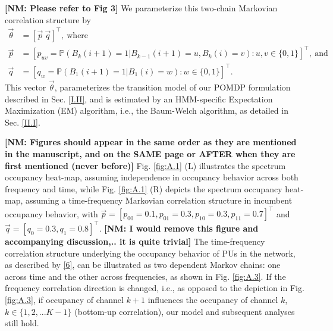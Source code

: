 \documentclass[12pt, draftcls, onecolumn]{IEEEtran}
\newcommand{\nm}[1]{{\color{blue}\bf{[NM: #1]}}}
\newcommand{\add}[1]{{\color{red}{#1}}}
\begin{document}
\nm{Please refer to Fig 3}
 We parameterize this two-chain Markovian correlation structure by
\add{the parameter vector $\vec{\theta}=[\vec{p}\ \vec{q}]^{\intercal}$, where}
\begin{equation}\label{7}
    \begin{aligned}
        \vec{\theta}&=[\vec{p}\ \vec{q}]^{\intercal},\ \text{where}\\
        \vec{p}&=[p_{uv}=\mathbb{P}(B_{k}(i+1)=1|B_{k-1}(i+1)=u,B_{k}(i)=v):u,v \in \{0,1\}]^{\intercal},\ \text{and}\\
        \vec{q}&=[q_{w}=\mathbb{P}(B_{1}(i+1)=1|B_{1}(i)=w):w \in \{0,1\}]^{\intercal}.
    \end{aligned}
\end{equation}
This vector $\vec{\theta}$, parameterizes the transition model of our POMDP formulation described in Sec. \ref{I.II}, and is estimated by an HMM-specific Expectation Maximization (EM) algorithm, i.e., the Baum-Welch algorithm, as detailed in Sec. \ref{II.I}.

\nm{Figures should appear in the same order as they are mentioned in the manuscript, and on the SAME page or AFTER when they are first mentioned (never before)}
Fig. \ref{fig:A.1} (L) illustrates the spectrum occupancy heat-map, assuming independence in occupancy behavior across both frequency and time, while Fig. \ref{fig:A.1} (R) depicts the spectrum occupancy heat-map, assuming a time-frequency Markovian correlation structure in incumbent occupancy behavior, with $\vec{p}{=}[p_{00}{=}0.1,p_{01}{=}0.3,p_{10}{=}0.3,p_{11}{=}0.7]^{\intercal}$ and $\vec{q}=[q_{0}{=}0.3,q_{1}{=}0.8]^{\intercal}$.
\nm{I would remove this figure and accompanying discussion,.. it is quite trivial}
 The time-frequency correlation structure underlying the occupancy behavior of PUs in the network, as described by \eqref{6}, can be illustrated as two dependent Markov chains: one across time and the other across frequencies, as shown in Fig. \ref{fig:A.3}. If the frequency correlation direction is changed, i.e., as opposed to the depiction in Fig. \ref{fig:A.3}, if occupancy of channel $k+1$ influences the occupancy of channel $k$, $k{\in}\{1,2,...K{-}1\}$ (bottom-up correlation), our model and subsequent analyses still hold.
\end{document}
